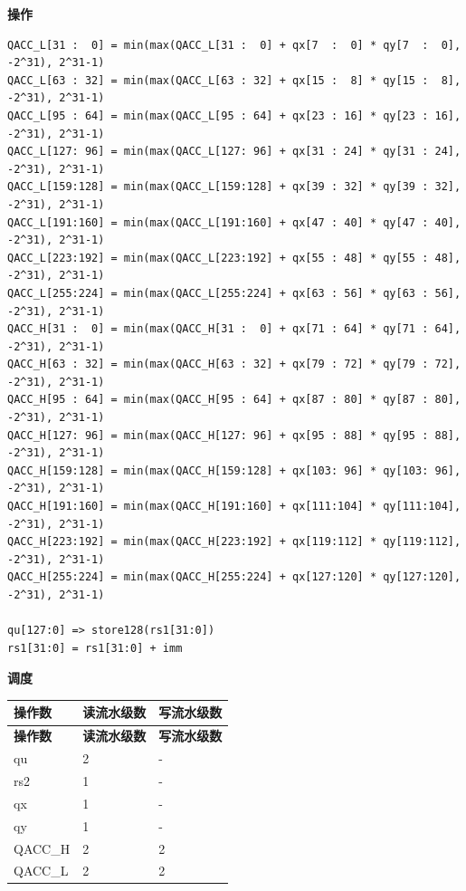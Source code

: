 \textbf{操作}\\
\begin{lstlisting}
QACC_L[31 :  0] = min(max(QACC_L[31 :  0] + qx[7  :  0] * qy[7  :  0], -2^31), 2^31-1)
QACC_L[63 : 32] = min(max(QACC_L[63 : 32] + qx[15 :  8] * qy[15 :  8], -2^31), 2^31-1)
QACC_L[95 : 64] = min(max(QACC_L[95 : 64] + qx[23 : 16] * qy[23 : 16], -2^31), 2^31-1)
QACC_L[127: 96] = min(max(QACC_L[127: 96] + qx[31 : 24] * qy[31 : 24], -2^31), 2^31-1)
QACC_L[159:128] = min(max(QACC_L[159:128] + qx[39 : 32] * qy[39 : 32], -2^31), 2^31-1)
QACC_L[191:160] = min(max(QACC_L[191:160] + qx[47 : 40] * qy[47 : 40], -2^31), 2^31-1)
QACC_L[223:192] = min(max(QACC_L[223:192] + qx[55 : 48] * qy[55 : 48], -2^31), 2^31-1)
QACC_L[255:224] = min(max(QACC_L[255:224] + qx[63 : 56] * qy[63 : 56], -2^31), 2^31-1)
QACC_H[31 :  0] = min(max(QACC_H[31 :  0] + qx[71 : 64] * qy[71 : 64], -2^31), 2^31-1)
QACC_H[63 : 32] = min(max(QACC_H[63 : 32] + qx[79 : 72] * qy[79 : 72], -2^31), 2^31-1)
QACC_H[95 : 64] = min(max(QACC_H[95 : 64] + qx[87 : 80] * qy[87 : 80], -2^31), 2^31-1)
QACC_H[127: 96] = min(max(QACC_H[127: 96] + qx[95 : 88] * qy[95 : 88], -2^31), 2^31-1)
QACC_H[159:128] = min(max(QACC_H[159:128] + qx[103: 96] * qy[103: 96], -2^31), 2^31-1)
QACC_H[191:160] = min(max(QACC_H[191:160] + qx[111:104] * qy[111:104], -2^31), 2^31-1)
QACC_H[223:192] = min(max(QACC_H[223:192] + qx[119:112] * qy[119:112], -2^31), 2^31-1)
QACC_H[255:224] = min(max(QACC_H[255:224] + qx[127:120] * qy[127:120], -2^31), 2^31-1)

qu[127:0] => store128(rs1[31:0])
rs1[31:0] = rs1[31:0] + imm
\end{lstlisting}

\textbf{调度}\\
\begin{longtable}[c]{|l|l|l|}
    \hline
    \rowcolor{lightgray}
    \textbf{操作数} & \textbf{读流水级数} & \textbf{写流水级数} \\\hline
    \endfirsthead
    \hline
    \rowcolor{lightgray}
     \textbf{操作数} & \textbf{读流水级数} & \textbf{写流水级数} \\\hline
    \endhead
    \hline
    \endfoot

    qu & 2 & - \\\hline
    rs2 & 1 & - \\\hline
     qx & 1 & - \\\hline
     qy & 1 & - \\\hline
     QACC\_H & 2 & 2 \\\hline
     QACC\_L & 2 & 2

\end{longtable}


